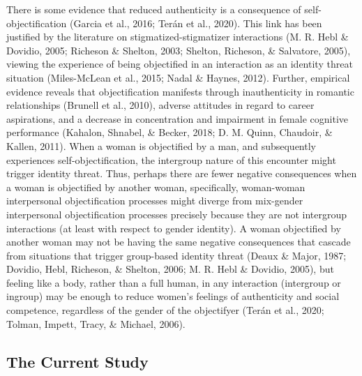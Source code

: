\documentclass[man]{apa6}
\begin{document}
There is some evidence that reduced authenticity is a consequence of
self-objectification (Garcia et al., 2016; Terán et al., 2020). This
link has been justified by the literature on stigmatized-stigmatizer
interactions (M. R. Hebl \& Dovidio, 2005; Richeson \& Shelton, 2003;
Shelton, Richeson, \& Salvatore, 2005), viewing the experience of being
objectified in an interaction as an identity threat situation
(Miles-McLean et al., 2015; Nadal \& Haynes, 2012). Further, empirical
evidence reveals that objectification manifests through inauthenticity
in romantic relationships (Brunell et al., 2010), adverse attitudes in
regard to career aspirations, and a decrease in concentration and
impairment in female cognitive performance (Kahalon, Shnabel, \& Becker,
2018; D. M. Quinn, Chaudoir, \& Kallen, 2011). When a woman is
objectified by a man, and subsequently experiences self-objectification,
the intergroup nature of this encounter might trigger identity threat.
Thus, perhaps there are fewer negative consequences when a woman is
objectified by another woman, specifically, woman-woman interpersonal
objectification processes might diverge from mix-gender interpersonal
objectification processes precisely because they are not intergroup
interactions (at least with respect to gender identity). A woman
objectified by another woman may not be having the same negative
consequences that cascade from situations that trigger group-based
identity threat (Deaux \& Major, 1987; Dovidio, Hebl, Richeson, \&
Shelton, 2006; M. R. Hebl \& Dovidio, 2005), but feeling like a body,
rather than a full human, in any interaction (intergroup or ingroup) may
be enough to reduce women's feelings of authenticity and social
competence, regardless of the gender of the objectifyer (Terán et al.,
2020; Tolman, Impett, Tracy, \& Michael, 2006).

\subsection{The Current Study}\label{the-current-study}
\end{document}
